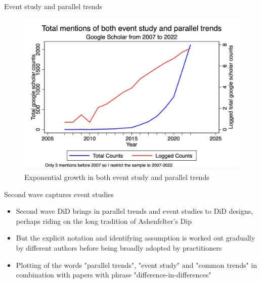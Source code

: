 \documentclass{beamer}
\begin{document}
\begin{frame}{Event study and parallel trends}

	\begin{figure}
	\caption{Exponential growth in both event study and parallel trends}
	\includegraphics[scale=0.2]{./lecture_includes/event_pt.png}
	\end{figure}

\end{frame}


\begin{frame}{Second wave captures event studies}

\begin{itemize}
\item Second wave DiD brings in parallel trends and event studies to DiD designs, perhaps riding on the long tradition of Ashenfelter's Dip
\item But the explicit notation and identifying assumption is worked out gradually by different authors before being broadly adopted by practitioners 
\item Plotting of the words "parallel trends", "event study" and "common trends" in combination with papers with phrase "difference-in-differences"

\end{itemize}

\end{frame}
\end{document}
